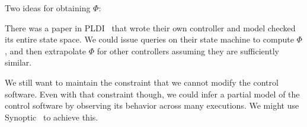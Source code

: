 Two ideas for obtaining $\Phi$:

 There was a paper in PLDI~\cite{vericon} that
wrote their own controller and model checked its entire state space. We could issue queries on their
state machine to compute $\Phi$, and then extrapolate $\Phi$ for other controllers assuming they are sufficiently similar.

 We still want to maintain the constraint that we cannot modify the control software.
Even with that constraint though, we could infer a partial model of the control software by observing its behavior across many executions.
We might use Synoptic~\cite{beschastnikh2011leveraging} to achieve this.
